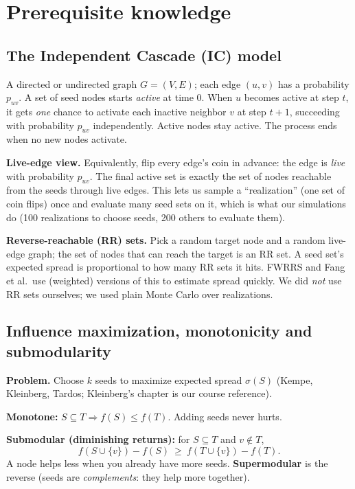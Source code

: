 \documentclass[11pt]{article}
\begin{document}
\section{Prerequisite knowledge}\label{sec:prereq}

\subsection{The Independent Cascade (IC) model}
A directed or undirected graph $G=(V,E)$; each edge $(u,v)$ has a probability $p_{uv}$. A set of seed nodes starts \emph{active} at time $0$. When $u$ becomes active at step $t$, it gets \emph{one} chance to activate each inactive neighbor $v$ at step $t+1$, succeeding with probability $p_{uv}$ independently. Active nodes stay active. The process ends when no new nodes activate.

\textbf{Live-edge view.} Equivalently, flip every edge's coin in advance: the edge is \emph{live} with probability $p_{uv}$. The final active set is exactly the set of nodes reachable from the seeds through live edges. This lets us sample a ``realization'' (one set of coin flips) once and evaluate many seed sets on it, which is what our simulations do (100 realizations to choose seeds, 200 others to evaluate them).

\textbf{Reverse-reachable (RR) sets.} Pick a random target node and a random live-edge graph; the set of nodes that can reach the target is an RR set. A seed set's expected spread is proportional to how many RR sets it hits. FWRRS and Fang et al.\ use (weighted) versions of this to estimate spread quickly. We did \emph{not} use RR sets ourselves; we used plain Monte Carlo over realizations.

\subsection{Influence maximization, monotonicity and submodularity}
\textbf{Problem.} Choose $k$ seeds to maximize expected spread $\sigma(S)$ (Kempe, Kleinberg, Tardos; Kleinberg's chapter is our course reference).

\textbf{Monotone:} $S\subseteq T\Rightarrow f(S)\le f(T)$. Adding seeds never hurts.

\textbf{Submodular (diminishing returns):} for $S\subseteq T$ and $v\notin T$,
\[
f(S\cup\{v\})-f(S)\ \ge\ f(T\cup\{v\})-f(T).
\]
A node helps less when you already have more seeds. \textbf{Supermodular} is the reverse (seeds are \emph{complements}: they help more together).
\end{document}
